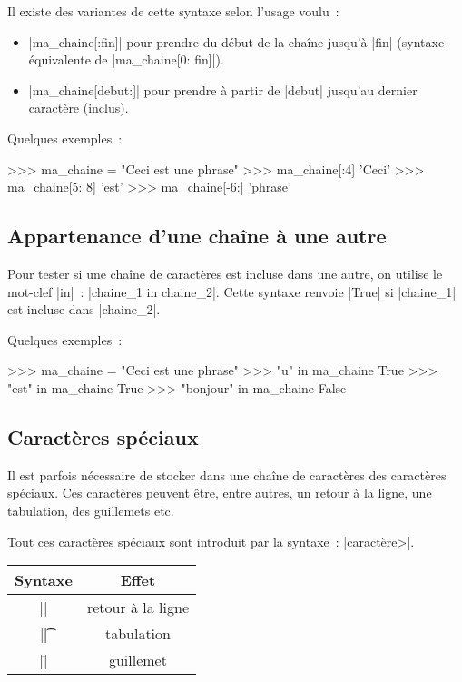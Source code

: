 		Il existe des variantes de cette syntaxe selon l'usage voulu~:
		\begin{itemize}
			\item \python|ma_chaine[:fin]| pour prendre du début de la chaîne jusqu'à \python|fin| (syntaxe équivalente de \python|ma_chaine[0: fin]|).
			\item \python|ma_chaine[debut:]| pour prendre à partir de \python|debut| jusqu'au dernier caractère (inclus).
		\end{itemize}
		
		Quelques exemples~:
		\begin{pythoncode}
			>>> ma_chaine = "Ceci est une phrase"
			>>> ma_chaine[:4]
			'Ceci'
			>>> ma_chaine[5: 8]
			'est'
			>>> ma_chaine[-6:]
			'phrase'
		\end{pythoncode}
	
	\subsection{Appartenance d'une chaîne à une autre}
		
		Pour tester si une chaîne de caractères est incluse dans une autre, on utilise le mot-clef \python|in|~: \python|chaine_1 in chaine_2|.
		Cette syntaxe renvoie \python|True| si \python|chaine_1| est incluse dans \python|chaine_2|.
		
		Quelques exemples~:
		
		\begin{pythoncode}
			>>> ma_chaine = "Ceci est une phrase"
			>>> "u" in ma_chaine
			True
			>>> "est" in ma_chaine
			True
			>>> "bonjour" in ma_chaine
			False
		\end{pythoncode}
	
	\subsection{Caractères spéciaux}
		
		Il est parfois nécessaire de stocker dans une chaîne de caractères des caractères spéciaux. Ces caractères peuvent être, entre autres, un retour à la ligne, une tabulation, des guillemets etc.
		
		Tout ces caractères spéciaux sont introduit par la syntaxe~: \python|\<caractère>|. \\
		\begin{tabular}{|c|c|} \hline
			Syntaxe & Effet \\ \hline \hline
			\python|\n| & retour à la ligne \\ \hline
			\python|\t| & tabulation \\ \hline
			\python|\"| & guillemet \\ \hline
		\end{tabular}
		
